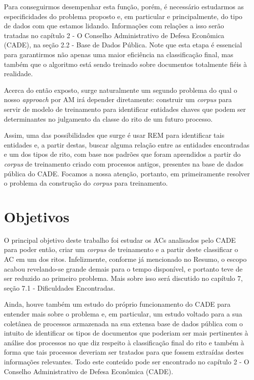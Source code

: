 \documentclass[11pt]{report}
\begin{document}
Para conseguirmos desempenhar esta função, porém, é necessário estudarmos as especificidades do problema proposto e, em particular e principalmente,
do tipo de dados com que estamos lidando. Informações com relações a isso serão tratadas no capítulo 2 - O Conselho Administrativo de Defesa Econômica (CADE), na seção 2.2 - Base de Dados Pública.
Note que esta etapa é essencial para garantirmos não apenas uma maior eficiência na classificação final, mas também que o algoritmo está sendo treinado sobre
documentos totalmente fiéis à realidade.

Acerca do então exposto, surge naturalmente um segundo problema do qual o nosso \textit{approach} por AM irá depender diretamente: construir um \textit{corpus} para servir de modelo de
treinamento para identificar entidades chaves que podem ser determinantes no julgamento da classe do rito de um futuro processo.

Assim, uma das possibilidades que surge é usar REM para identificar tais entidades e, a partir destas, buscar alguma relação entre as entidades encontradas e um dos tipos de rito, com
base nos padrões que foram aprendidos a partir do \textit{corpus} de treinamento criado com processos antigos, presentes na base de dados pública do CADE. Focamos
a nossa atenção, portanto, em primeiramente resolver o problema da construção do \textit{corpus} para treinamento.

\section{Objetivos}

\indent\indent O principal objetivo deste trabalho foi estudar os ACs analisados pelo CADE para poder então, criar um \textit{corpus} de treinamento e a partir deste classificar
o AC em um dos ritos. Infelizmente, conforme já mencionado no Resumo, o escopo acabou revelando-se grande demais para o tempo disponível, e portanto teve de ser reduzido
ao primeiro problema. Mais sobre isso será discutido no capítulo 7, seção 7.1 - Dificuldades Encontradas.

Ainda, houve também um estudo do próprio funcionamento do CADE para entender mais sobre o problema e, em particular, um estudo voltado para a sua coletânea de processos
armazenada na sua extensa base de dados pública com o intuito de identificar os tipos de documentos que poderiam ser mais pertinentes à análise dos processos no que diz respeito
à classificação final do rito e também à forma que tais processos deveriam ser tratados para que fossem extraídas destes informações relevantes. Todo este conteúdo pode ser encontrado no
capítulo 2 - O Conselho Administrativo de Defesa Econômica (CADE).
\end{document}
